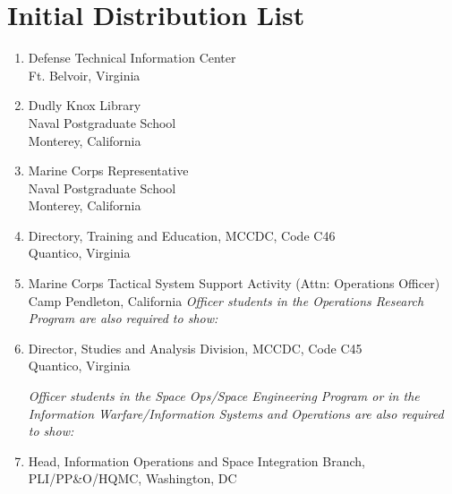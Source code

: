 \documentclass[twoside,thesis,twoadvisors]{npsreport}
\begin{document}
\chapter*{Initial Distribution List}
\singlespace
\begin{enumerate}
\item Defense Technical Information Center\\Ft. Belvoir, Virginia
\item Dudly Knox Library\\Naval Postgraduate School\\Monterey, California
\item Marine Corps Representative\\Naval Postgraduate School\\Monterey, California
\item Directory, Training and Education, MCCDC, Code C46\\Quantico, Virginia
\item Marine Corps Tactical System Support Activity (Attn: Operations
  Officer)\\Camp Pendleton, California
\textit{Officer students in the Operations Research Program are also required
to show:}

\item Director, Studies and Analysis Division, MCCDC, Code C45\\
Quantico, Virginia

\textit{Officer students in the Space Ops/Space Engineering Program or in the
Information Warfare/Information Systems and Operations are also
required to show:}

\item Head, Information Operations and Space Integration Branch,\\
PLI/PP\&O/HQMC, Washington, DC
\end{enumerate}
\end{document}
